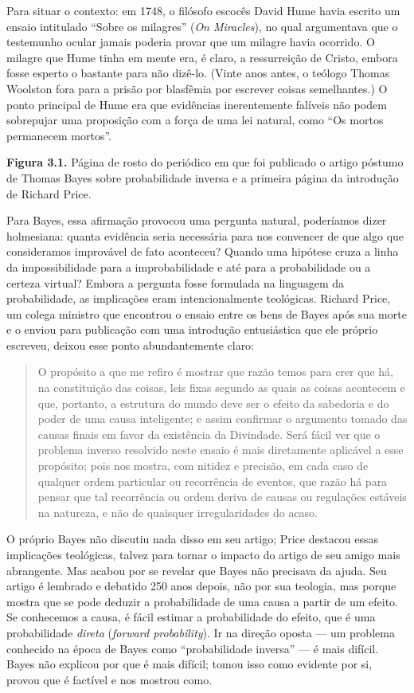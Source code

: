 \documentclass[11pt,a5paper,twoside]{book}
\begin{document}
Para situar o contexto: em 1748, o filósofo escocês David Hume havia escrito um ensaio intitulado “Sobre os milagres” (\textit{On Miracles}), no qual argumentava que o testemunho ocular jamais poderia provar que um milagre havia ocorrido. O milagre que Hume tinha em mente era, é claro, a ressurreição de Cristo, embora fosse esperto o bastante para não dizê-lo. (Vinte anos antes, o teólogo Thomas Woolston fora para a prisão por blasfêmia por escrever coisas semelhantes.) O ponto principal de Hume era que evidências inerentemente falíveis não podem sobrepujar uma proposição com a força de uma lei natural, como “Os mortos permanecem mortos”.

\textbf{Figura 3.1.} Página de rosto do periódico em que foi publicado o artigo póstumo de Thomas Bayes sobre probabilidade inversa e a primeira página da introdução de Richard Price.

Para Bayes, essa afirmação provocou uma pergunta natural, poderíamos dizer holmesiana: quanta evidência seria necessária para nos convencer de que algo que consideramos improvável de fato aconteceu? Quando uma hipótese cruza a linha da impossibilidade para a improbabilidade e até para a probabilidade ou a certeza virtual? Embora a pergunta fosse formulada na linguagem da probabilidade, as implicações eram intencionalmente teológicas. Richard Price, um colega ministro que encontrou o ensaio entre os bens de Bayes após sua morte e o enviou para publicação com uma introdução entusiástica que ele próprio escreveu, deixou esse ponto abundantemente claro:

\begin{quote}
O propósito a que me refiro é mostrar que razão temos para crer que há, na constituição das coisas, leis fixas segundo as quais as coisas acontecem e que, portanto, a estrutura do mundo deve ser o efeito da sabedoria e do poder de uma causa inteligente; e assim confirmar o argumento tomado das causas finais em favor da existência da Divindade. Será fácil ver que o problema inverso resolvido neste ensaio é mais diretamente aplicável a esse propósito; pois nos mostra, com nitidez e precisão, em cada caso de qualquer ordem particular ou recorrência de eventos, que razão há para pensar que tal recorrência ou ordem deriva de causas ou regulações estáveis na natureza, e não de quaisquer irregularidades do acaso.
\end{quote}
O próprio Bayes não discutiu nada disso em seu artigo; Price destacou essas implicações teológicas, talvez para tornar o impacto do artigo de seu amigo mais abrangente. Mas acabou por se revelar que Bayes não precisava da ajuda. Seu artigo é lembrado e debatido 250 anos depois, não por sua teologia, mas porque mostra que se pode deduzir a probabilidade de uma causa a partir de um efeito. Se conhecemos a causa, é fácil estimar a probabilidade do efeito, que é uma probabilidade \textit{direta} (\textit{forward probability}). Ir na direção oposta — um problema conhecido na época de Bayes como “probabilidade inversa” — é mais difícil. Bayes não explicou por que é mais difícil; tomou isso como evidente por si, provou que é factível e nos mostrou como.
\end{document}
